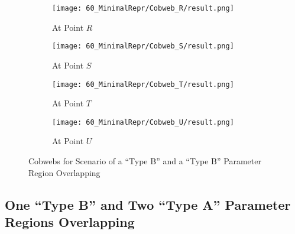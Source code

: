 \begin{figure}
    \centering
    \begin{subfigure}{0.4\textwidth}
        \texttt{[image: 60\_MinimalRepr/Cobweb\_R/result.png]}
        \caption{At Point $R$}
        \label{fig:minrep.cobweb.R}
    \end{subfigure}
    \begin{subfigure}{0.4\textwidth}
        \texttt{[image: 60\_MinimalRepr/Cobweb\_S/result.png]}
        \caption{At Point $S$}
        \label{fig:minrep.cobweb.S}
    \end{subfigure}
    \begin{subfigure}{0.4\textwidth}
        \texttt{[image: 60\_MinimalRepr/Cobweb\_T/result.png]}
        \caption{At Point $T$}
        \label{fig:minrep.cobweb.T}
    \end{subfigure}
    \begin{subfigure}{0.4\textwidth}
        \texttt{[image: 60\_MinimalRepr/Cobweb\_U/result.png]}
        \caption{At Point $U$}
        \label{fig:minrep.cobweb.U}
    \end{subfigure}
    \caption{Cobwebs for Scenario of a ``Type B'' and a ``Type B'' Parameter Region Overlapping}
\end{figure}

\subsection{One ``Type B'' and Two ``Type A'' Parameter Regions Overlapping}

